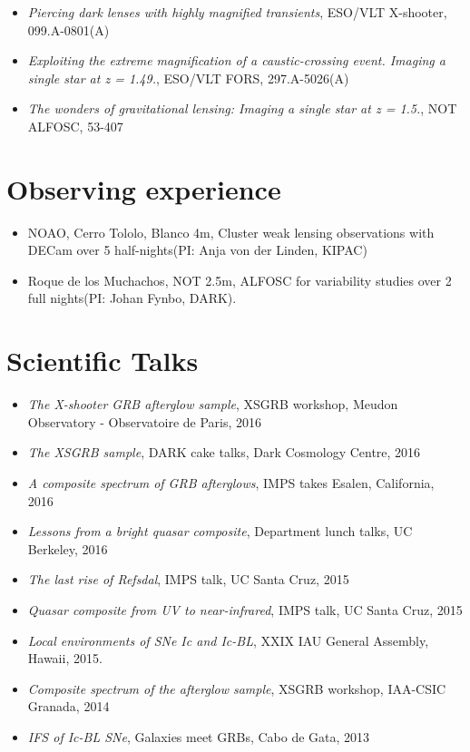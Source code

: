 \documentclass[12pt,letterpaper]{article}
\begin{document}
	\begin{itemize}
    \item {\it Piercing dark lenses with highly magnified transients}, ESO/VLT X-shooter,  099.A-0801(A)
    \item {\it Exploiting the extreme magnification of a caustic-crossing event. Imaging a single star at z = 1.49.}, ESO/VLT FORS,  297.A-5026(A)
    \item {\it The wonders of gravitational lensing: Imaging a single star at z = 1.5.}, NOT ALFOSC,  53-407
	\end{itemize}

\section*{Observing experience}

\begin{itemize}
	\item NOAO, Cerro Tololo, Blanco 4m, Cluster weak lensing observations with DECam over 5 half-nights(PI: Anja von der Linden, KIPAC)
	\item Roque de los Muchachos, NOT 2.5m, ALFOSC for variability studies over 2 full nights(PI: Johan Fynbo, DARK).
\end{itemize}


\section*{Scientific Talks}

\begin{itemize}
     \item \emph{The X-shooter GRB afterglow sample}, XSGRB workshop, Meudon Observatory - Observatoire de Paris, 2016
    \item \emph{The XSGRB sample}, DARK cake talks, Dark Cosmology Centre, 2016
    \item \emph{A composite spectrum of GRB afterglows}, IMPS takes Esalen, California, 2016 
    \item \emph{Lessons from a bright quasar composite}, Department lunch talks, UC Berkeley, 2016 
    \item \emph{The last rise of Refsdal}, IMPS talk, UC Santa Cruz, 2015
    \item \emph{Quasar composite from UV to near-infrared}, IMPS talk, UC Santa Cruz, 2015
    \item \emph{Local environments of SNe Ic and Ic-BL}, XXIX IAU General Assembly, Hawaii, 2015.
    \item \emph{Composite spectrum of the afterglow sample}, XSGRB workshop, IAA-CSIC Granada, 2014
    \item \emph{IFS of Ic-BL SNe}, Galaxies meet GRBs, Cabo de Gata, 2013


\end{itemize}
\end{document}
